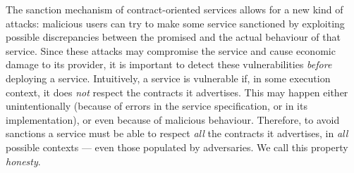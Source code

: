 The sanction mechanism of contract-oriented services
allows for a new kind of attacks: 
malicious users can try
to make some service sanctioned by exploiting possible discrepancies between
the promised and the actual behaviour of that service. %
Since these attacks may compromise the service and cause economic damage to its provider,
it is important to detect these vulnerabilities \emph{before} deploying a service. %
Intuitively, a service is vulnerable if, 
in some execution context,
it does \emph{not} respect the contracts it advertises.
This may happen either unintentionally
(because of errors in the service specification, or in its implementation),
or even because of malicious behaviour.
Therefore, to avoid sanctions a service must be able
to respect \emph{all} the contracts it advertises, in \emph{all} possible contexts
--- even those populated by adversaries.
We call this property \emph{honesty}.

